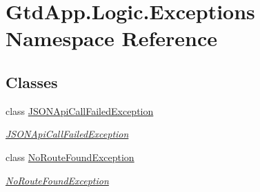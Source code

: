 \hypertarget{namespace_gtd_app_1_1_logic_1_1_exceptions}{}\section{Gtd\+App.\+Logic.\+Exceptions Namespace Reference}
\label{namespace_gtd_app_1_1_logic_1_1_exceptions}
\subsection*{Classes}
\begin{DoxyCompactItemize}
\item 
class \mbox{\hyperlink{class_gtd_app_1_1_logic_1_1_exceptions_1_1_j_s_o_n_api_call_failed_exception}{J\+S\+O\+N\+Api\+Call\+Failed\+Exception}}
\begin{DoxyCompactList}\small\item\em \mbox{\hyperlink{class_gtd_app_1_1_logic_1_1_exceptions_1_1_j_s_o_n_api_call_failed_exception}{J\+S\+O\+N\+Api\+Call\+Failed\+Exception}} \end{DoxyCompactList}\item 
class \mbox{\hyperlink{class_gtd_app_1_1_logic_1_1_exceptions_1_1_no_route_found_exception}{No\+Route\+Found\+Exception}}
\begin{DoxyCompactList}\small\item\em \mbox{\hyperlink{class_gtd_app_1_1_logic_1_1_exceptions_1_1_no_route_found_exception}{No\+Route\+Found\+Exception}} \end{DoxyCompactList}\end{DoxyCompactItemize}
